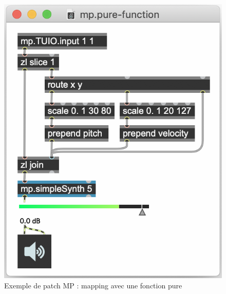 \begin{figure}[!htbp]
	\captionsetup{format=plain}%
	\centering
	\begin{minipage}[t]{0.485\textwidth}
		\includegraphics[width=\linewidth]{gfx/04_algorithms/MP-mappingPure.png}
		\caption[Exemple de patch MP : fonction pure]{Exemple de patch MP : mapping avec une fonction pure}
		\label{fig:algorithms:MP-pure}
	\end{minipage}
	\hspace{.01\linewidth}
	\begin{minipage}[t]{0.485\textwidth}

\end{minipage}
\end{figure}
